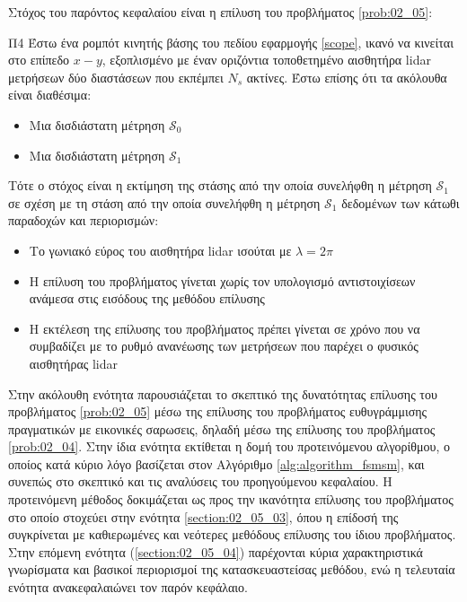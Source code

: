 Στόχος του παρόντος κεφαλαίου είναι η επίλυση του προβλήματος \ref{prob:02_05}:

\begin{bw_box}
\begin{customproblem}{Π4}
  \label{prob:02_05}
  Έστω ένα ρομπότ κινητής βάσης του πεδίου εφαρμογής \ref{scope}, ικανό να
  κινείται στο επίπεδο $x-y$, εξοπλισμένο με έναν οριζόντια τοποθετημένο
  αισθητήρα lidar μετρήσεων δύο διαστάσεων που εκπέμπει $N_s$ ακτίνες. Έστω
  επίσης ότι τα ακόλουθα είναι διαθέσιμα:
  \begin{itemize}
    \item Μια δισδιάστατη μέτρηση $\mathcal{S}_0$
    \item Μια δισδιάστατη μέτρηση $\mathcal{S}_1$
  \end{itemize}
\end{customproblem}
Τότε ο στόχος είναι η εκτίμηση της στάσης από την οποία συνελήφθη η μέτρηση
$\mathcal{S}_1$ σε σχέση με τη στάση από την οποία συνελήφθη η μέτρηση
$\mathcal{S}_1$ δεδομένων των κάτωθι παραδοχών και περιορισμών:
\begin{itemize}
  \item Το γωνιακό εύρος του αισθητήρα lidar ισούται με $\lambda = 2\pi$
  \item Η επίλυση του προβλήματος γίνεται χωρίς τον υπολογισμό αντιστοιχίσεων
        ανάμεσα στις εισόδους της μεθόδου επίλυσης
  \item Η εκτέλεση της επίλυσης του προβλήματος πρέπει γίνεται σε χρόνο που να
        συμβαδίζει με το ρυθμό ανανέωσης των μετρήσεων που παρέχει ο φυσικός
        αισθητήρας lidar
\end{itemize}

\end{bw_box}

Στην ακόλουθη ενότητα παρουσιάζεται το σκεπτικό της δυνατότητας επίλυσης του
προβλήματος \ref{prob:02_05} μέσω της επίλυσης του προβλήματος ευθυγράμμισης
πραγματικών με εικονικές σαρωσεις, δηλαδή μέσω της επίλυσης του προβλήματος
\ref{prob:02_04}. Στην ίδια ενότητα εκτίθεται η δομή του προτεινόμενου
αλγορίθμου, ο οποίος κατά κύριο λόγο βασίζεται στον Αλγόριθμο
\ref{alg:algorithm_fsmsm}, και συνεπώς στο σκεπτικό και τις αναλύσεις του
προηγούμενου κεφαλαίου. Η προτεινόμενη μέθοδος δοκιμάζεται ως προς την
ικανότητα επίλυσης του προβλήματος στο οποίο στοχεύει στην ενότητα
\ref{section:02_05_03}, όπου η επίδοσή της συγκρίνεται με καθιερωμένες και
νεότερες μεθόδους επίλυσης του ίδιου προβλήματος. Στην επόμενη ενότητα
(\ref{section:02_05_04}) παρέχονται κύρια χαρακτηριστικά γνωρίσματα και
βασικοί περιορισμοί της κατασκευαστείσας μεθόδου, ενώ η τελευταία ενότητα
ανακεφαλαιώνει τον παρόν κεφάλαιο.
